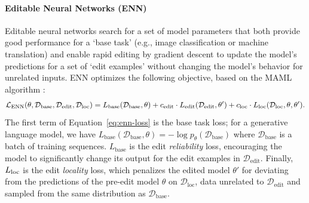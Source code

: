 \documentclass{article}
\begin{document}
\paragraph{Editable Neural Networks (ENN)}
\label{sec:enn-prelims}
Editable neural networks \citep{Sinitsin2020Editable} search for a set of model parameters that both provide good performance for a `base task' (e.g., image classification or machine translation) and enable rapid editing by gradient descent to update the model's predictions for a set of `edit examples' without changing the model's behavior for unrelated inputs. ENN optimizes the following objective, based on the MAML algorithm \citep{finn2017maml}:
\begin{align}
    \mathcal{L}_\text{ENN}(\theta, \mathcal{D}_\text{base}, \mathcal{D}_\text{edit}, \mathcal{D}_\text{loc}) =  L_\text{base}(\mathcal{D}_\text{base}, \theta) + c_\text{edit}\cdot L_\text{edit}(\mathcal{D}_\text{edit}, \theta^\prime) + c_\text{loc}\cdot L_\text{loc}(\mathcal{D}_\text{loc}, \theta, \theta^\prime).\label{eq:enn-loss}
\end{align}
The first term of Equation~\ref{eq:enn-loss} is the base task loss; for a generative language model, we have $ L_\text{base}(\mathcal{D}_\text{base}, \theta) = -\log p_{\theta}(\mathcal{D}_\text{base})$ where $\mathcal{D}_\text{base}$ is a batch of training sequences. $ L_\text{base}$ is the edit \textit{reliability} loss, encouraging the model to significantly change its output for the edit examples in $\mathcal{D}_\text{edit}$. Finally, $L_\text{loc}$ is the edit \textit{locality} loss, which penalizes the edited model $\theta'$ for deviating from the predictions of the pre-edit model $\theta$ on $\mathcal{D}_\text{loc}$, data unrelated to $\mathcal{D}_\text{edit}$ and sampled from the same distribution as $\mathcal{D}_\text{base}$.
\end{document}
